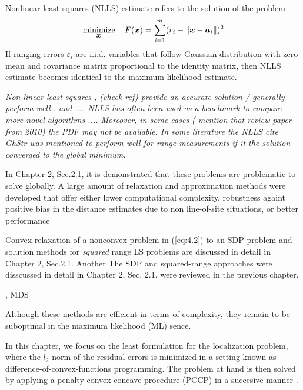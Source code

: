Nonlinear least squares (NLLS) estimate refers to the solution of the problem
\begin{equation}\label{eq:4.2} %
\Min_{\Bx} \quad F(\Bx)=\sum_{i=1}^{m} (r_i - \|{\Bx} - {\Ba}_i\|)^2
\end{equation}
If ranging errors $\varepsilon_i$ are i.i.d. variables that follow Gaussian distribution with zero mean and covariance matrix proportional to the identity matrix, then NLLS estimate becomes identical to the maximum likelihood estimate. 

\textit{
Non linear least squares  \cite{UWB, GhStr}, (check ref) provide an accurate solution / generally perform well \cite{UWB, GhStr}. and .... NLLS has often been used as a benchmark to compare more novel algorithms \cite{UWB, BeckStLi, more-more}....
Moreover, in some cases ( mention that review paper from 2010) the PDF may not be available. In some literature the NLLS \textit{cite GhStr} was mentioned to perform well for range measurements if it the solution converged to the global minimum.
}


In Chapter 2, Sec.2.1, it is demonstrated that these problems are problematic to solve globally. A large amount of relaxation and approximation methods were developed that offer either lower computational complexity, robustness againt positive bias in the distance estimates due to non line-of-site situations, or better performance 

Convex relaxation of a nonconvex problem in (\ref{eq:4.2}) to an SDP problem and solution methods for \textit{squared} range LS problems are discussed in detail in Chapter 2, Sec.2.1. Another 
The SDP and squared-range approaches were disscussed in detail in Chapter 2, Sec. 2.1.  were reviewed in the previous chapter.


, MDS \cite{classMDS, fastMDS, dwMDS}

Although these methods are efficient in terms of complexity, they remain to be suboptimal in the maximum likelihood (ML) sence. 





In this chapter, we focus on the least  formulation for the localization problem, where the $l_2$-norm of the residual errors is minimized in a setting known as difference-of-convex-functions programming. The problem at hand is then solved by applying a penalty convex-concave procedure (PCCP) in a succesive manner \cite{PCCP}.

